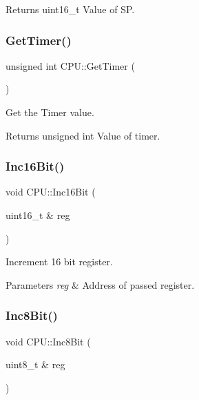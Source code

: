 \begin{DoxyReturn}{Returns}
uint16\+\_\+t Value of SP. 
\end{DoxyReturn}
\mbox{\label{classCPU_a61fc2fe8c3cdbb6a5628ae5a1bfe3fa2}} 
\subsubsection{\texorpdfstring{Get\+Timer()}{GetTimer()}}
{\footnotesize\ttfamily unsigned int C\+P\+U\+::\+Get\+Timer (\begin{DoxyParamCaption}{ }\end{DoxyParamCaption})}



Get the Timer value. 

\begin{DoxyReturn}{Returns}
unsigned int Value of timer. 
\end{DoxyReturn}
\mbox{\label{classCPU_aafc3e6a96e8216a8711e108f76eefd4d}} 
\subsubsection{\texorpdfstring{Inc16\+Bit()}{Inc16Bit()}}
{\footnotesize\ttfamily void C\+P\+U\+::\+Inc16\+Bit (\begin{DoxyParamCaption}\item[{uint16\+\_\+t \&}]{reg }\end{DoxyParamCaption})\hspace{0.3cm}{\ttfamily [private]}}



Increment 16 bit register. 


\begin{DoxyParams}{Parameters}
{\em reg} & Address of passed register. \\
\hline
\end{DoxyParams}
\mbox{\label{classCPU_aa227001fff979e13c04b5dd3bea042fd}} 
\subsubsection{\texorpdfstring{Inc8\+Bit()}{Inc8Bit()}}
{\footnotesize\ttfamily void C\+P\+U\+::\+Inc8\+Bit (\begin{DoxyParamCaption}\item[{uint8\+\_\+t \&}]{reg }\end{DoxyParamCaption})\hspace{0.3cm}{\ttfamily [private]}}



